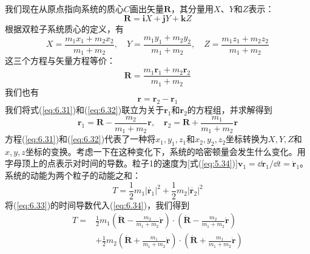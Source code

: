     我们现在从原点指向系统的质心$C$画出矢量$\mathbf{R}$，其分量用$X$、$Y$和$Z$表示：
    \begin{equation}
        \mathbf{R} = \mathbf{i}X + \mathbf{j}Y + \mathbf{k}Z
        \label{eq:6.29}
    \end{equation}
    根据双粒子系统质心的定义，有
    \begin{equation}
        X = \frac{m_1x_1 + m_2x_2}{m_1 + m_2}, \quad Y = \frac{m_1y_1 + m_2y_2}{m_1 + m_2}, \quad Z = \frac{m_1z_1 + m_2z_2}{m_1 + m_2}
        \label{eq:6.30}
    \end{equation}
    这三个方程与矢量方程等价：
    \begin{equation}
        \mathbf{R} = \frac{m_1\mathbf{r}_1 + m_2\mathbf{r}_2}{m_1 + m_2}
        \label{eq:6.31}
    \end{equation}
    我们也有
    \begin{equation}
        \mathbf{r} = \mathbf{r}_2 - \mathbf{r}_1
        \label{eq:6.32}
    \end{equation}
    我们将式(\ref{eq:6.31})和(\ref{eq:6.32})联立为关于$\mathbf{r}_1$和$\mathbf{r}_2$的方程组，并求解得到
    \begin{equation}
        \mathbf{r}_1 = \mathbf{R} - \frac{m_2}{m_1 + m_2}\mathbf{r}, \quad \mathbf{r}_2 = \mathbf{R} + \frac{m_1}{m_1 + m_2}\mathbf{r}
        \label{eq:6.33}
    \end{equation}
    方程(\ref{eq:6.31})和(\ref{eq:6.32})代表了一种将$x_1,y_1,z_1$和$x_2,y_2,z_2$坐标转换为$X,Y,Z$和$x,y,z$坐标的变换。考虑一下在这种变化下，系统的哈密顿量会发生什么变化。用字母顶上的点表示对时间的导数。粒子1的速度为[式(\ref{eq:5.34})]$\mathbf{v}_1 = \dd \mathbf{r}_1/\dd t = \dot{\mathbf{r}}_1$。系统的动能为两个粒子的动能之和：
    \begin{equation}
        T = \frac{1}{2}m_1\left|\dot{\mathbf{r}_1}\right|^2 + \frac{1}{2}m_2\left|\dot{\mathbf{r}_2}\right|^2
        \label{eq:6.34}
    \end{equation}
    将(\ref{eq:6.33})的时间导数代入(\ref{eq:6.34})，我们得到
    \begin{equation*}
        \begin{aligned}
            T = & \frac{1}{2}m_1\left(\dot{\mathbf{R}} - \frac{m_2}{m_1+m_2}\dot{\mathbf{r}}\right)\cdot \left(\dot{\mathbf{R}} - \frac{m_2}{m_1+m_2}\dot{\mathbf{r}}\right) \\
            & + \frac{1}{2}m_2\left(\dot{\mathbf{R}} + \frac{m_1}{m_1+m_2}\dot{\mathbf{r}}\right)\cdot \left(\dot{\mathbf{R}} + \frac{m_1}{m_1+m_2}\dot{\mathbf{r}}\right) \\
        \end{aligned}
    \end{equation*}
